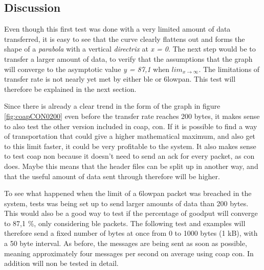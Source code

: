 \subsection{Discussion}

Even though this first test was done with a very limited amount of data transferred, it is easy to see that the curve clearly flattens out and forms the shape of a \textit{\gls{parabola}} with a vertical \textit{\gls{directrix}} at \textit{x = 0}. The next step would be to transfer a larger amount of data, to verify that the assumptions that the graph will converge to the asymptotic value \textit{y = 87,1} when $lim_{x\to\infty}$. The limitations of transfer rate is not nearly yet met by either \gls{ble} or \gls{6lowpan}. This test will therefore be explained in the next section. 


Since there is already a clear trend in the form of the graph in figure \ref{fig:coapCON0200} even before the transfer rate reaches 200 bytes, it makes sense to also test the other version included in \gls{coap}, \gls{con}. If it is possible to find a way of transportation that could give a higher mathematical maximum, and also get to this limit faster, it could be very profitable to the system. It also makes sense to test \gls{coap} \gls{non} because it doesn’t need to send an \gls{ack} for every packet, as \gls{con} does. Maybe this means that the header files can be split up in another way, and that the useful amount of data sent through therefore will be higher. 



To see what happened when the limit of a \gls{6lowpan} packet was breached in the system, tests was being set up to send larger amounts of data than 200 bytes. This would also be a good way to test if the percentage of goodput will converge to 87,1 \%, only considering \gls{ble} packets. The following test and examples will therefore send a fixed number of bytes at once from 0 to 1000 bytes (1 kB), with a 50 byte interval. As before, the messages are being sent as soon as possible, meaning approximately four messages per second on average using \gls{coap} \gls{con}. In addition will \gls{non} be tested in detail. 


